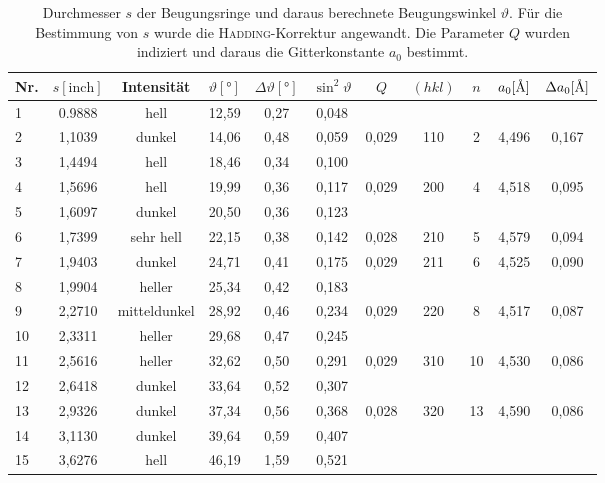 \documentclass[a4paper,twoside,final]{article}
\begin{document}
\begin{table}[ht]
	\centering
	\caption{Durchmesser $s$ der Beugungsringe und daraus berechnete Beugungswinkel $\vartheta$. Für die Bestimmung von $s$ wurde die \textsc{Hadding}-Korrektur angewandt. Die Parameter $Q$ wurden indiziert und daraus die Gitterkonstante $a_0$ bestimmt.}
	\label{tab:Ergebnisse_ohneFilter}
	\begin{tabular}{l c c c c c | c c c c c }
		\toprule
      Nr. & $s [\text{inch}]$ & Intensität & $\vartheta [\si{\degree}]$ & $\Delta \vartheta [\si{\degree}]$ & $\sin^2 \vartheta $ & $Q$ & $(hkl)$ & $n$ & $a_0 [\si{\textup{\AA}}]$ & $\Delta a_0 [\si{\textup{\AA}}]$\\
    \midrule
    1  & 0.9888 & hell         & 12,59 & 0,27 & 0,048 &       &     &    &       &       \\
    2  & 1,1039 & dunkel       & 14,06 & 0,48 & 0,059 & 0,029 & 110 & 2  & 4,496 & 0,167 \\
    3  & 1,4494 & hell         & 18,46 & 0,34 & 0,100 &       &     &    &       &       \\
    4  & 1,5696 & hell         & 19,99 & 0,36 & 0,117 & 0,029 & 200 & 4  & 4,518 & 0,095 \\
    5  & 1,6097 & dunkel       & 20,50 & 0,36 & 0,123 &       &     &    &       &       \\
    6  & 1,7399 & sehr hell    & 22,15 & 0,38 & 0,142 & 0,028 & 210 & 5  & 4,579 & 0,094 \\
    7  & 1,9403 & dunkel       & 24,71 & 0,41 & 0,175 & 0,029 & 211 & 6  & 4,525 & 0,090 \\
    8  & 1,9904 & heller       & 25,34 & 0,42 & 0,183 &       &     &    &       &       \\
    9  & 2,2710 & mitteldunkel & 28,92 & 0,46 & 0,234 & 0,029 & 220 & 8  & 4,517 & 0,087 \\
    10 & 2,3311 & heller       & 29,68 & 0,47 & 0,245 &       &     &    &       &       \\
    11 & 2,5616 & heller       & 32,62 & 0,50 & 0,291 & 0,029 & 310 & 10 & 4,530 & 0,086 \\
    12 & 2,6418 & dunkel       & 33,64 & 0,52 & 0,307 &       &     &    &       &       \\
    13 & 2,9326 & dunkel       & 37,34 & 0,56 & 0,368 & 0,028 & 320 & 13 & 4,590 & 0,086 \\
    14 & 3,1130 & dunkel       & 39,64 & 0,59 & 0,407 &       &     &    &       &       \\
    15 & 3,6276 & hell         & 46,19 & 1,59 & 0,521 &       &     &    &       &       \\

\end{tabular}
\end{table}
\end{document}
